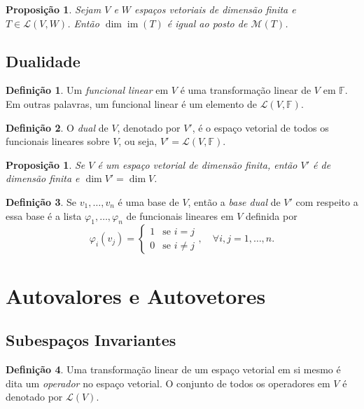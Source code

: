 \documentclass[12pt]{article}
\theoremstyle{plain}
\newtheorem{prop}[thm]{Proposição}
\theoremstyle{definition}
\newtheorem{defn}{Definição}[section]
\theoremstyle{remark}
\DeclareMathOperator{\im}{im}
\begin{document}
\begin{prop}
    Sejam \(V\) e \(W\) espaços vetoriais de dimensão finita e \(T \in \mathcal{L}(V, W)\). Então \(\dim \im(T)\) é igual ao posto de \(\mathcal{M}(T)\).
\end{prop}

\subsection{Dualidade}

\begin{defn}
    Um \emph{funcional linear} em \(V\) é uma transformação linear de \(V\) em \(\mathbb{F}\). Em outras palavras, um funcional linear é um elemento de \(\mathcal{L}(V, \mathbb{F})\).
\end{defn}

\begin{defn}
    O \emph{dual} de \(V\), denotado por \(V'\), é o espaço vetorial de todos os funcionais lineares sobre \(V\), ou seja, \(V' = \mathcal{L}(V, \mathbb{F})\).
\end{defn}

\begin{prop}
    Se \(V\) é um espaço vetorial de dimensão finita, então \(V'\) é de dimensão finita e \(\dim V' = \dim V\).
\end{prop}

\begin{defn}
    Se \(v_1, \ldots, v_n\) é uma base de \(V\), então a \emph{base dual} de \(V'\) com respeito a essa base é a lista \(\varphi_1, \ldots, \varphi_n\) de funcionais lineares em \(V\) definida por
    \[
        \varphi_i(v_j) = \begin{cases}
            1 & \text{se } i = j \\
            0 & \text{se } i \neq j
        \end{cases}, \quad \forall i,j = 1,\ldots,n.
    \]
\end{defn}

\section{Autovalores e Autovetores}
\subsection{Subespaços Invariantes}

\begin{defn}
    Uma transformação linear de um espaço vetorial em si mesmo é dita um \emph{operador} no espaço vetorial. O conjunto de todos os operadores em \(V\) é denotado por \(\mathcal{L}(V)\).    
\end{defn}
\end{document}
